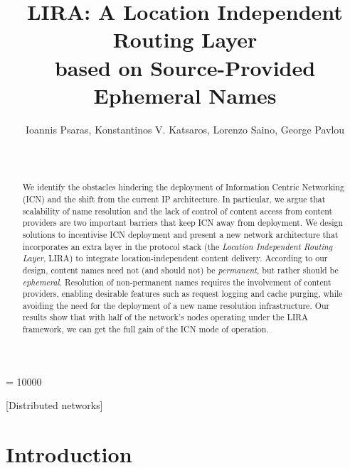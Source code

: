 \documentclass{sig-alternate}
\begin{document}
\widowpenalty = 10000


\title{LIRA: A Location Independent Routing Layer \\ based on Source-Provided Ephemeral Names
}

\author{
\alignauthor
Ioannis Psaras, Konstantinos V. Katsaros, Lorenzo Saino, George Pavlou \\
       \\
       \\
}



\maketitle


\begin{abstract}

We identify the obstacles hindering the deployment of Information Centric Networking (ICN) and the shift from the current IP architecture. In particular, we argue that scalability of name resolution and the lack of control of content access from content providers are two important barriers that keep ICN away from deployment.
We design solutions to incentivise ICN deployment and present a new network architecture that incorporates an extra layer in the protocol stack (the \textit{Location Independent Routing Layer}, LIRA) to integrate location-independent content delivery.
According to our design, content names need not (and should not) be \textit{permanent}, but rather should be \textit{ephemeral}.
Resolution of non-permanent names requires the involvement of content providers, enabling desirable features such as request logging and cache purging, while avoiding the need for the deployment of a new name resolution infrastructure. Our results show that with half of the network's nodes operating under the LIRA framework, we can get the full gain of the ICN mode of operation.


\end{abstract}

[Distributed networks]

\makeatletter{}
\section{Introduction}
\end{document}
